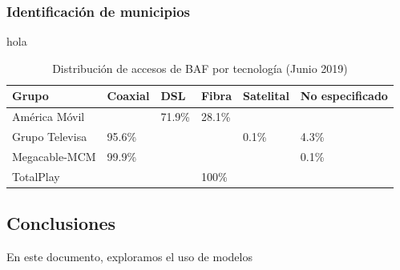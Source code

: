 \documentclass[9pt,twocolumn,twoside]{ilcss}
\begin{document}
\subsubsection{Identificación de municipios}

hola

\begin{table}[tbhp]
 \centering
	\caption{Distribución de accesos de BAF por tecnología (Junio 2019)\label{table:distribaccesosgrupos}}
	\begin{tabular}{@{}llllll@{}}
		\toprule
		Grupo & Coaxial & DSL & Fibra & Satelital & No especificado \\ \midrule
		América Móvil &  & 71.9\% & 28.1\% &  &  \\
		Grupo Televisa & 95.6\% &  &  & 0.1\% & 4.3\% \\
		Megacable-MCM & 99.9\% &  &  &  & 0.1\% \\
		TotalPlay &  &  & 100\% &  &  \\ \bottomrule
	\end{tabular}
\end{table}


\subsection{Conclusiones}

En este documento, exploramos el uso de modelos

\end{document}
